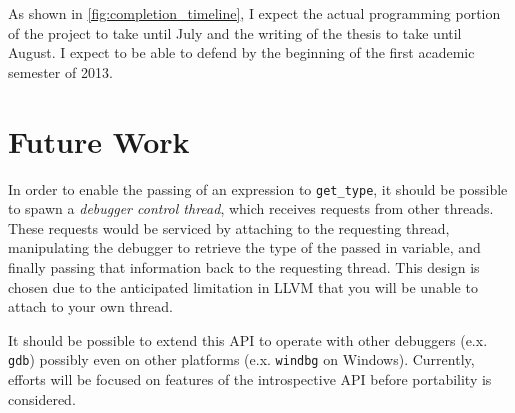 \documentclass[twocolumn,draft]{article}
\begin{document}
As shown in \vref{fig:completion_timeline}, I expect the actual programming
portion of the project to take until July and the writing of the thesis to take
until August. I expect to be able to defend by the beginning of the first
academic semester of 2013.

\section{Future Work}
\label{sec:future_work}
In order to enable the passing of an expression to \texttt{get\_type}, it should
be possible to spawn a \emph{debugger control thread}, which receives requests
from other threads. These requests would be serviced by attaching to the
requesting thread, manipulating the debugger to retrieve the type of the passed
in variable, and finally passing that information back to the requesting thread.
This design is chosen due to the anticipated limitation in LLVM that you will be
unable to attach to your own thread.

It should be possible to extend this API to operate with other debuggers (e.x.
\texttt{gdb}) possibly even on other platforms (e.x. \texttt{windbg} on
Windows). Currently, efforts will be focused on features of the introspective
API before portability is considered.



\end{document}
